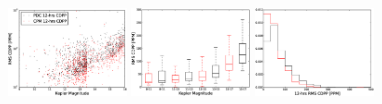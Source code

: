 \begin{figure}[p]
\begin{center}
\includegraphics[width=0.28\textwidth]{figures/cpm/f6g}
\includegraphics[width=0.28\textwidth]{figures/cpm/f6h}
\includegraphics[width=0.28\textwidth]{figures/cpm/f6i}


\end{center}
\end{figure}

